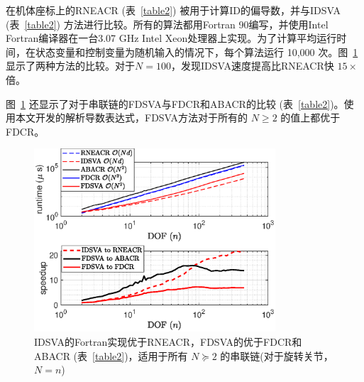 \documentclass[letterpaper, 10 pt, conference]{ieeetran}  %
\begin{document}
在机体座标上的RNEACR\cite[Algos.~2 \& 3]{car} (表~\ref{table2}) 被用于计算ID的偏导数，并与IDSVA (表~\ref{table2}) 方法进行比较。所有的算法都用Fortran 90编写，并使用Intel Fortran编译器在一台3.07 GHz Intel Xeon处理器上实现。为了计算平均运行时间，在状态变量和控制变量为随机输入的情况下，每个算法运行 10,000 次。图~\ref{all_plots_fortran} 显示了两种方法的比较。对于$N=100$，发现IDSVA速度提高比RNEACR快 $15 \times$ 倍。

 图~\ref{all_plots_fortran} 还显示了对于串联链的FDSVA与FDCR和ABACR的比较 (表~\ref{table2})。使用本文开发的解析导数表达式，FDSVA方法对于所有的 $N \ge 2$ 的值上都优于FDCR。
 
 
 
 
\begin{figure}[tb]
\hspace{-0.5cm}
\includegraphics[width=9cm]{all_plots_fortran.eps}
\caption{IDSVA的Fortran实现优于RNEACR，FDSVA的优于FDCR和ABACR (表~\ref{table2})，适用于所有 $N \succeq 2$ 的串联链(对于旋转关节，$N = n$)}
\label{all_plots_fortran}
\end{figure}
\end{document}
